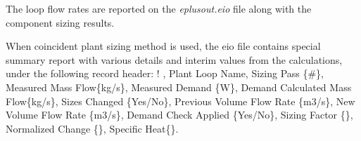 The loop flow rates are reported on the \emph{eplusout.eio} file along with the component sizing results.

When coincident plant sizing method is used, the eio file contains special summary report with various details and interim values from the calculations, under the following record header: ! , Plant Loop Name, Sizing Pass \{\#\}, Measured Mass Flow\{kg/s\}, Measured Demand \{W\}, Demand Calculated Mass Flow\{kg/s\}, Sizes Changed \{Yes/No\}, Previous Volume Flow Rate \{m3/s\}, New Volume Flow Rate \{m3/s\}, Demand Check Applied \{Yes/No\}, Sizing Factor \{\}, Normalized Change \{\}, Specific Heat\{\}.
